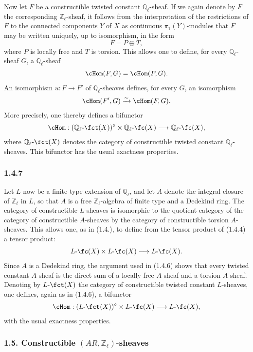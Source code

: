 Now let \(F\) be a constructible twisted constant \(\mathbb Q_\ell\)-sheaf. If we again denote by \(F\) the corresponding \(\mathbb Z_\ell\)-sheaf, it follows from the interpretation of the restrictions of \(F\) to the connected components \(Y\) of \(X\) as continuous \(\pi_1(Y)\)-modules that \(F\) may be written uniquely, up to isomorphism, in the form
\[
F=P\oplus T,
\]
where \(P\) is locally free and \(T\) is torsion. This allows one to define, for every \(\mathbb Q_\ell\)-sheaf \(G\), a \(\mathbb Q_\ell\)-sheaf
\[
\cHom(F,G)=\cHom(P,G).
\]
An isomorphism \(u:F\to F'\) of \(\mathbb Q_\ell\)-sheaves defines, for every \(G\), an isomorphism
\[
\cHom(F',G)\xrightarrow{\sim}\cHom(F,G).
\]
More precisely, one thereby defines a bifunctor
\[
\cHom:(\mathbb Q_\ell\text{-}\fct(X))^\circ\times \mathbb Q_\ell\text{-}\fc(X)
\longrightarrow \mathbb Q_\ell\text{-}\fc(X),
\]
where \(\mathbb Q_\ell\text{-}\fct(X)\) denotes the category of constructible twisted constant \(\mathbb Q_\ell\)-sheaves. This bifunctor has the usual exactness properties.

\subsubsection*{1.4.7}
Let \(L\) now be a finite-type extension of \(\mathbb Q_\ell\), and let \(A\) denote the integral closure of \(\mathbb Z_\ell\) in \(L\), so that \(A\) is a free \(\mathbb Z_\ell\)-algebra of finite type and a Dedekind ring. The category of constructible \(L\)-sheaves is isomorphic to the quotient category of the category of constructible \(A\)-sheaves by the category of constructible torsion \(A\)-sheaves. This allows one, as in (1.4.), to define from the tensor product of (1.4.4) a tensor product:
\[
L\text{-}\fc(X)\times L\text{-}\fc(X)\longrightarrow L\text{-}\fc(X).
\]
Since \(A\) is a Dedekind ring, the argument used in (1.4.6) shows that every twisted constant \(A\)-sheaf is the direct sum of a locally free \(A\)-sheaf and a torsion \(A\)-sheaf. Denoting by \(L\text{-}\fct(X)\) the category of constructible twisted constant \(L\)-sheaves, one defines, again as in (1.4.6), a bifunctor
\[
\cHom:(L\text{-}\fct(X))^\circ\times L\text{-}\fc(X)
\longrightarrow L\text{-}\fc(X),
\]
with the usual exactness properties.

\subsubsection*{1.5. Constructible \((AR,\mathbb Z_\ell)\)-sheaves}

